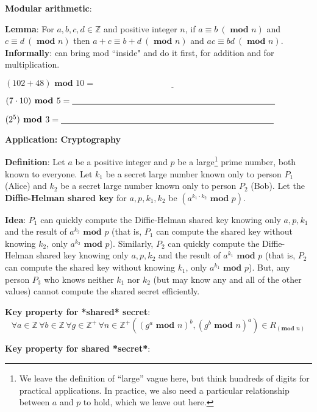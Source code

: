 \documentclass[12pt, oneside]{article}
\begin{document}
{\bf Modular arithmetic}: 

{\bf Lemma}: For $a, b, c, d \in \mathbb{Z}$ 
and positive integer $n$, if $a \equiv b ~(\textbf{ mod } n)$ and $c \equiv d ~(\textbf{ mod } n)$ 
then $a+c \equiv b+d ~(\textbf{ mod } n)$ and $ac \equiv bd ~(\textbf{ mod } n)$.
{\bf Informally}: can bring mod ``inside" and do it first, for addition and for multiplication.


$(102 + 48) \textbf{ mod } 10 = \underline{\phantom{\hspace{3in}}} $ 

$(7 \cdot 10) \textbf{ mod } 5 = \underline{\phantom{\hspace{3.3in}}} $ 

$(2^5) \textbf{ mod } 3 =  \underline{\phantom{\hspace{3.45in}}} $ 

\vfill

 \newpage
{\bf Application: Cryptography}

{\bf Definition}: Let $a$ be a positive integer and $p$ be a 
large\footnote{We leave the definition of ``large'' vague here, but 
think hundreds of digits for practical applications. In practice, 
we also need a particular relationship between $a$ and $p$ to hold, 
which we leave out here.} prime number, both known to everyone. 
Let $k_1$ be a secret large number known only to person $P_1$ (Alice) 
and $k_2$ be a secret large number known only to person $P_2$ (Bob). 
Let the {\bf Diffie-Helman shared key} for $a, p, k_1, k_2$ be 
$(a^{k_1\cdot k_2} \textbf{ mod } p)$.


{\bf Idea}: $P_1$ can quickly compute the Diffie-Helman shared key 
knowing only $a, p, k_1$ and the result of $a^{k_2} \textbf{ mod } p$ 
(that is, $P_1$ can compute the shared key without knowing $k_2$, 
only $a^{k_2} \textbf{ mod } p$). Similarly, $P_2$ can 
quickly compute the Diffie-Helman shared key knowing only 
$a, p, k_2$ and the result of $a^{k_1} \textbf{ mod } p$ 
(that is, $P_2$ can compute the shared key without knowing $k_1$, 
only $a^{k_1} \textbf{ mod } p$). But, any person $P_3$ who 
knows neither $k_1$ nor $k_2$ (but may know any and all of the other values) 
cannot compute the shared secret efficiently.

{\bf Key property for *shared* secret}: 
\[
    \forall a \in \mathbb{Z} \, \forall b \in \mathbb{Z} \, \forall g \in \mathbb{Z}^+ \, 
    \forall n \in \mathbb{Z}^+ ((g^a \textbf{ mod } n)^b, (g^b \textbf{ mod } n)^a) \in R_{(\textbf{mod } n)}
\]

{\bf Key property for shared *secret*}:
\end{document}
